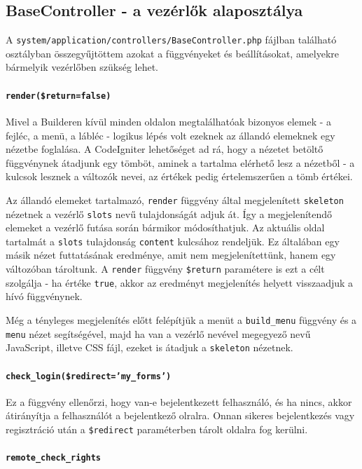 \documentclass[12pt,a4paper,twoside]{article}
\begin{document}
\subsection{BaseController - a vezérlők alaposztálya}

A \texttt{system/application/controllers/BaseController.php} fájlban található
osztályban összegyűjtöttem azokat a függvényeket és beállításokat, amelyekre
bármelyik vezérlőben szükség lehet.

\paragraph{\texttt{render(\$return=false)}}
Mivel a Builderen kívül minden oldalon megtalálhatóak bizonyos
elemek - a fejléc, a menü, a lábléc - logikus lépés volt ezeknek az állandó
elemeknek egy nézetbe foglalása. A CodeIgniter lehetőséget ad rá, hogy a
nézetet betöltő függvénynek átadjunk egy tömböt, aminek a tartalma elérhető lesz
a nézetből - a kulcsok lesznek a változók nevei, az értékek pedig értelemszerűen
a tömb értékei.

Az állandó elemeket tartalmazó, \texttt{render} függvény által megjelenített
\texttt{skeleton} nézetnek a vezérlő \texttt{slots} nevű tulajdonságát adjuk
át. Így a megjelenítendő elemeket a vezérlő futása során bármikor
módosíthatjuk. Az aktuális oldal tartalmát a \texttt{slots} tulajdonság
\texttt{content} kulcsához rendeljük. Ez általában egy másik nézet futtatásának
eredménye, amit nem megjelenítettünk, hanem egy változóban tároltunk. A
\texttt{render} függvény \texttt{\$return} paramétere is ezt a célt szolgálja -
ha értéke \texttt{true}, akkor az eredményt megjelenítés helyett visszaadjuk a
hívó függvénynek.

Még a tényleges megjelenítés előtt felépítjük a menüt a \texttt{build\_menu}
függvény és a \texttt{menu} nézet segítségével, majd ha van a vezérlő nevével
megegyező nevű JavaScript, illetve CSS fájl, ezeket is átadjuk a
\texttt{skeleton} nézetnek.

\paragraph{\texttt{check\_login(\$redirect='my\_forms')}}
Ez a függvény ellenőrzi, hogy van-e bejelentkezett felhasználó, és ha nincs,
akkor átirányítja a felhasználót a bejelentkező olralra. Onnan sikeres
bejelentkezés vagy regisztráció után a \texttt{\$redirect} paraméterben tárolt
oldalra fog kerülni.

\paragraph{\texttt{remote\_check\_rights}}
\label{par:check_rights}
\end{document}
